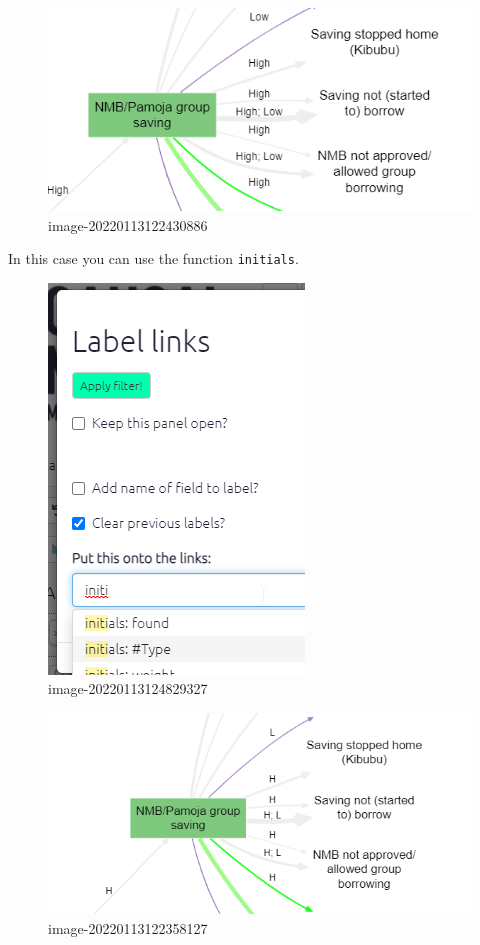 \documentclass[
]{book}
\begin{document}
\begin{figure}
\centering
\includegraphics{_assets/image-20220113122430886.png}
\caption{image-20220113122430886}
\end{figure}

In this case you can use the function \texttt{initials}.

\begin{figure}
\centering
\includegraphics{_assets/image-20220113124829327.png}
\caption{image-20220113124829327}
\end{figure}

\begin{figure}
\centering
\includegraphics{_assets/image-20220113122358127.png}
\caption{image-20220113122358127}
\end{figure}
\end{document}

